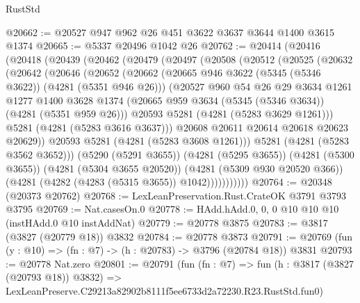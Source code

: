 \begin{lexlean}{RustStd}
\begin{coremodule}
@20662 := @20527 @947 @962 @26 @451 @3622 @3637 @3644 @1400 @3615 @1374
@20665 := @5337 @20496 @1042 @26
@20762 := @20414
    (@20416
      (@20418
        (@20439
          (@20462
            (@20479
              (@20497
                (@20508
                  (@20512
                    (@20525
                      (@20632
                        (@20642
                          (@20646
                            (@20652
                              (@20662
                                (@20665 @946 @3622 (@5345 (@5346 @3622)) (@4281 (@5351 @946 @26)))
                                (@20527
                                  @960
                                  @54
                                  @26
                                  @29
                                  @3634
                                  @1261
                                  @1277
                                  @1400
                                  @3628
                                  @1374
                                  (@20665 @959 @3634 (@5345 (@5346 @3634)) (@4281 (@5351 @959 @26)))
                                  @20593
                                  @5281
                                  (@4281 (@5283 @3629 @1261)))
                                @5281
                                (@4281 (@5283 @3616 @3637)))
                              @20608
                              @20611
                              @20614
                              @20618
                              @20623
                              @20629))
                          @20593
                          @5281
                          (@4281 (@5283 @3608 @1261)))
                        @5281
                        (@4281 (@5283 @3562 @3652)))
                      (@5290 (@5291 @3655))
                      (@4281 (@5295 @3655))
                      (@4281 (@5300 @3655))
                      (@4281 (@5304 @3655 @20520))
                      (@4281 (@5309 @930 @20520 @366))
                      (@4281 (@4282 (@4283 (@5315 @3655)) @1042)))))))))))
@20764 := @20348 (@20373 @20762)
@20768 := LexLeanPreservation.Rust.CrateOK @3791 @3793 @3795
@20769 := Nat.casesOn.{0}
@20778 := HAdd.hAdd.{0, 0, 0} @10 @10 @10 (instHAdd.{0} @10 instAddNat)
@20779 := @20778 @3875
@20783 := @3817 (@3827 (@20779 @18)) @3832
@20784 := @20778 @3873
@20791 := @20769 (fun (y : @10) => (fn : @7) -> (h : @20783) -> @3796 (@20784 @18)) @3831
@20793 := @20778 Nat.zero
@20801 := @20791
    (fun (fn : @7) =>
    fun (h : @3817 (@3827 (@20793 @18)) @3832) =>
    LexLeanPreserve.C29213a82902b8111f5ee6733d2a72230.R23.RustStd.fun0)

\end{coremodule}
\end{lexlean}
